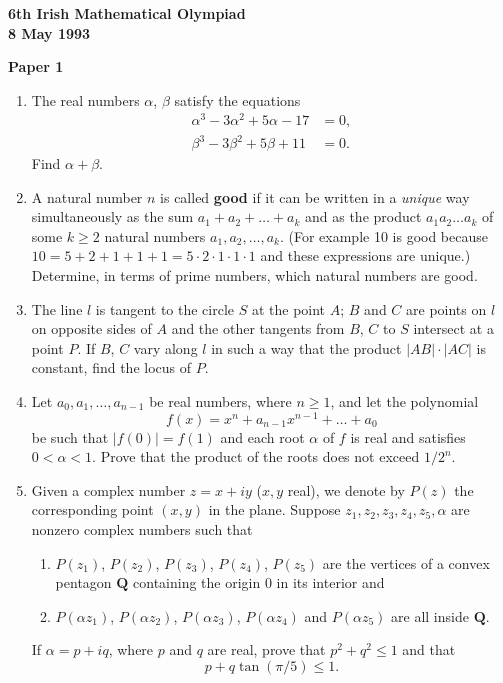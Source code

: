 \documentclass[12pt]{article}
\begin{document}
\begin{center}
{\large\bfseries 6th Irish Mathematical Olympiad\\8 May 1993}
\end{center}
\bigskip\noindent\textbf{Paper 1}\bigskip
\begin{enumerate}
\item The real numbers $\alpha$, $\beta$ satisfy the equations
\begin{align*}
\alpha^3 - 3\alpha^2 + 5\alpha - 17 &= 0,\\
\beta^3 - 3\beta^2 + 5\beta + 11 &= 0.
\end{align*}
Find $\alpha + \beta$.

\item A natural number $n$ is called \textbf{good} if it can be written in a \emph{unique} way simultaneously as the sum $a_1 + a_2 + \ldots + a_k$ and as the product $a_1a_2\ldots a_k$ of some $k \ge 2$ natural numbers $a_1, a_2, \ldots, a_k$. (For example 10 is good because $10 = 5 + 2 + 1 + 1 + 1 = 5 \cdot 2 \cdot 1 \cdot 1 \cdot 1$ and these expressions are unique.) Determine, in terms of prime numbers, which natural numbers are good.

\item The line $l$ is tangent to the circle $S$ at the point $A$; $B$ and $C$ are points on $l$ on opposite sides of $A$ and the other tangents from $B$, $C$ to $S$ intersect at a point $P$. If $B$, $C$ vary along $l$ in such a way that the product $|AB|\cdot|AC|$ is constant, find the locus of $P$.

\item Let $a_0, a_1, \ldots, a_{n-1}$ be real numbers, where $n \ge 1$, and let the polynomial
\[f(x) = x^n + a_{n-1}x^{n-1} + \ldots + a_0\]
be such that $|f(0)| = f(1)$ and each root $\alpha$ of $f$ is real and satisfies $0 < \alpha < 1$. Prove that the product of the roots does not exceed $1/2^n$.

\item Given a complex number $z = x + iy$ ($x, y$ real), we denote by $P(z)$ the corresponding point $(x,y)$ in the plane. Suppose $z_1, z_2, z_3, z_4, z_5, \alpha$ are nonzero complex numbers such that
\begin{enumerate}
\item[(a)] $P(z_1)$, $P(z_2)$, $P(z_3)$, $P(z_4)$, $P(z_5)$ are the vertices of a convex pentagon $\mathbf{Q}$ containing the origin 0 in its interior and
\item[(b)] $P(\alpha z_1)$, $P(\alpha z_2)$, $P(\alpha z_3)$, $P(\alpha z_4)$ and $P(\alpha z_5)$ are all inside $\mathbf{Q}$.
\end{enumerate}
If $\alpha = p + iq$, where $p$ and $q$ are real, prove that $p^2 + q^2 \le 1$ and that
\[p + q\tan(\pi/5) \le 1.\]
\end{enumerate}
\end{document}
